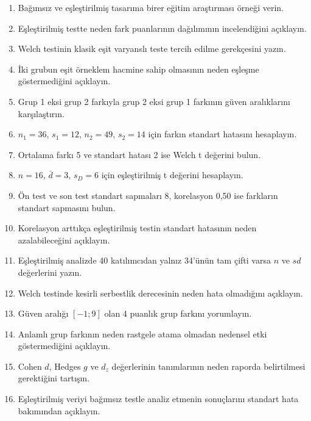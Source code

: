 \begin{enumerate}
  \item Bağımsız ve eşleştirilmiş tasarıma birer eğitim araştırması örneği verin.
  \item Eşleştirilmiş testte neden fark puanlarının dağılımının incelendiğini açıklayın.
  \item Welch testinin klasik eşit varyanslı teste tercih edilme gerekçesini yazın.
  \item İki grubun eşit örneklem hacmine sahip olmasının neden eşleşme göstermediğini açıklayın.
  \item Grup 1 eksi grup 2 farkıyla grup 2 eksi grup 1 farkının güven aralıklarını karşılaştırın.
  \item $n_1=36$, $s_1=12$, $n_2=49$, $s_2=14$ için farkın standart hatasını hesaplayın.
  \item Ortalama farkı 5 ve standart hatası 2 ise Welch t değerini bulun.
  \item $n=16$, $\bar d=3$, $s_D=6$ için eşleştirilmiş t değerini hesaplayın.
  \item Ön test ve son test standart sapmaları 8, korelasyon 0,50 ise farkların standart sapmasını bulun.
  \item Korelasyon arttıkça eşleştirilmiş testin standart hatasının neden azalabileceğini açıklayın.
  \item Eşleştirilmiş analizde 40 katılımcıdan yalnız 34'ünün tam çifti varsa $n$ ve $sd$ değerlerini yazın.
  \item Welch testinde kesirli serbestlik derecesinin neden hata olmadığını açıklayın.
  \item Güven aralığı $[-1;9]$ olan 4 puanlık grup farkını yorumlayın.
  \item Anlamlı grup farkının neden rastgele atama olmadan nedensel etki göstermediğini açıklayın.
  \item Cohen $d$, Hedges $g$ ve $d_z$ değerlerinin tanımlarının neden raporda belirtilmesi gerektiğini tartışın.
  \item Eşleştirilmiş veriyi bağımsız testle analiz etmenin sonuçlarını standart hata bakımından açıklayın.
\end{enumerate}